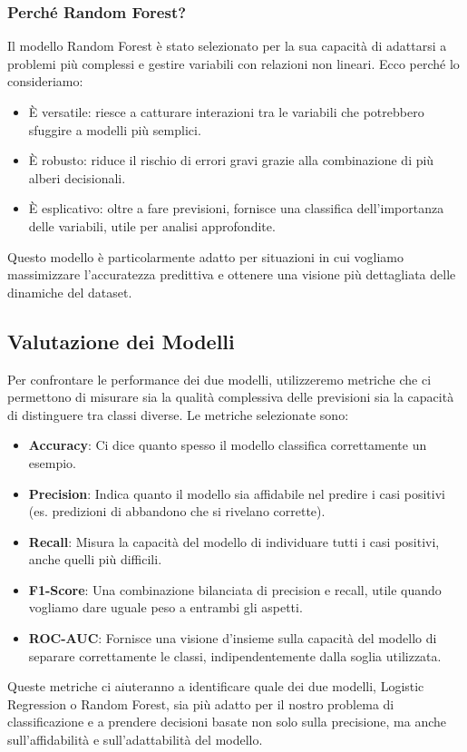\documentclass[a4paper,12pt]{article}
\begin{document}
\subsubsection{Perché Random Forest?}
Il modello Random Forest è stato selezionato per la sua capacità di adattarsi a problemi più complessi e gestire variabili con relazioni non lineari. Ecco perché lo consideriamo:
\begin{itemize}
    \item È versatile: riesce a catturare interazioni tra le variabili che potrebbero sfuggire a modelli più semplici.
    \item È robusto: riduce il rischio di errori gravi grazie alla combinazione di più alberi decisionali.
    \item È esplicativo: oltre a fare previsioni, fornisce una classifica dell'importanza delle variabili, utile per analisi approfondite.
\end{itemize}
Questo modello è particolarmente adatto per situazioni in cui vogliamo massimizzare l'accuratezza predittiva e ottenere una visione più dettagliata delle dinamiche del dataset.

\subsection{Valutazione dei Modelli}
Per confrontare le performance dei due modelli, utilizzeremo metriche che ci permettono di misurare sia la qualità complessiva delle previsioni sia la capacità di distinguere tra classi diverse. Le metriche selezionate sono:
\begin{itemize}
    \item \textbf{Accuracy}: Ci dice quanto spesso il modello classifica correttamente un esempio.
    \item \textbf{Precision}: Indica quanto il modello sia affidabile nel predire i casi positivi (es. predizioni di abbandono che si rivelano corrette).
    \item \textbf{Recall}: Misura la capacità del modello di individuare tutti i casi positivi, anche quelli più difficili.
    \item \textbf{F1-Score}: Una combinazione bilanciata di precision e recall, utile quando vogliamo dare uguale peso a entrambi gli aspetti.
    \item \textbf{ROC-AUC}: Fornisce una visione d'insieme sulla capacità del modello di separare correttamente le classi, indipendentemente dalla soglia utilizzata.
\end{itemize}
Queste metriche ci aiuteranno a identificare quale dei due modelli, Logistic Regression o Random Forest, sia più adatto per il nostro problema di classificazione e a prendere decisioni basate non solo sulla precisione, ma anche sull'affidabilità e sull'adattabilità del modello.
\end{document}
